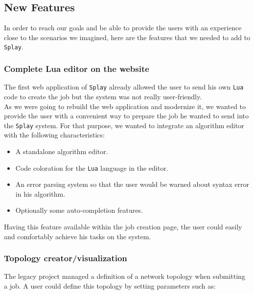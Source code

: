 \documentclass{eplmastersthesis}
\begin{document}
      \subsection{New Features}

        In order to reach our goals and be able to provide the users with
        an experience close to the scenarios we imagined, here are the
        features that we needed to add to \texttt{Splay}.

        \subsubsection{Complete Lua editor on the website}

          The first web application of \texttt{Splay} already allowed the user to send
          his own \texttt{Lua} code to create the job but the system was not really
          user-friendly.\\

          As we were going to rebuild the web application and modernize it,
          we wanted to provide the user with a convenient way to prepare
          the job he wanted to send into the \texttt{Splay} system. For that purpose,
          we wanted to integrate an algorithm editor with the following
          characteristics:

          \begin{itemize}
            \item A standalone algorithm editor.
            \item Code coloration for the \texttt{Lua} language in the editor.
            \item An error parsing system so that the user would be warned
            about syntax error in his algorithm.
            \item Optionally some auto-completion features.
          \end{itemize}

          Having this feature available within the job creation page, the user
          could easily and comfortably achieve his tasks on the system.

        \subsubsection{Topology creator/visualization}

          The legacy project managed a definition of a network topology when
          submitting a job. A user could define this topology by setting
          parameters such as:
\end{document}
